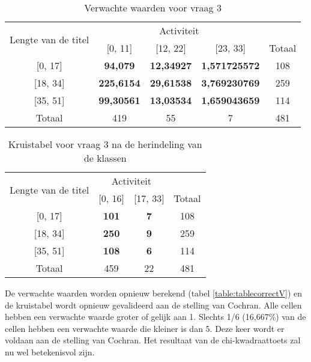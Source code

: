 \begin{table}[]
	\centering
	\begin{tabular}{|c|c|c|c|c|}
		\hline
		\multirow{2}{*}{Lengte van de titel} & \multicolumn{3}{c|}{Activiteit}            & \multicolumn{1}{l|}{} \\ \cline{2-5} 
		& {[}0, 11{]}  & {[}12, 22{]} & {[}23, 33{]} & Totaal                \\ \hline
		{[}0, 17{]}                          & \textbf{94,079}  & \textbf{12,34927}   & \textbf{1,571725572}   & 108                   \\ \hline
		{[}18, 34{]}                         & \textbf{225,6154} & \textbf{29,61538}  & \textbf{3,769230769}   & 259                   \\ \hline
		{[}35, 51{]}                         & \textbf{99,30561} & \textbf{13,03534}  & \textbf{1,659043659}   & 114                   \\ \hline
		Totaal                               & 419          & 55           & 7            & 481                   \\ \hline
	\end{tabular}
	\caption{Verwachte waarden voor vraag 3}
	\label{table:tablewrongV}
\end{table}

\begin{table}[]
	\centering
	\begin{tabular}{|c|c|c|c|}
		\hline
		\multirow{2}{*}{Lengte van de titel} & \multicolumn{2}{c|}{Activiteit} & \multicolumn{1}{l|}{} \\ \cline{2-4} 
		& {[}0, 16{]}    & {[}17, 33{]}   & Totaal                \\ \hline
		{[}0, 17{]}                          & \textbf{101}   & \textbf{7}     & 108                   \\ \hline
		{[}18, 34{]}                         & \textbf{250}   & \textbf{9}     & 259                   \\ \hline
		{[}35, 51{]}                         & \textbf{108}   & \textbf{6}     & 114                   \\ \hline
		Totaal                               & 459            & 22             & 481                   \\ \hline
	\end{tabular}
	\caption{Kruistabel voor vraag 3 na de herindeling van de klassen}
	\label{table:tablecorrect}
\end{table}

De verwachte waarden worden opnieuw berekend (tabel \ref{table:tablecorrectV}) en de kruistabel wordt opnieuw gevalideerd aan de stelling van Cochran. Alle cellen hebben een verwachte waarde groter of gelijk aan 1. Slechts 1/6 (16,667\%) van de cellen hebben een verwachte waarde die kleiner is dan 5. Deze keer wordt er voldaan aan de stelling van Cochran. Het resultaat van de chi-kwadraattoets zal nu wel betekenisvol zijn.

